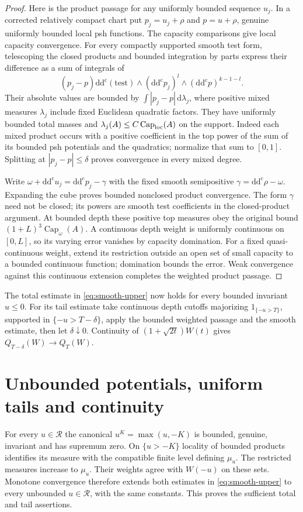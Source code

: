 \documentclass[11pt]{article}
\theoremstyle{remark}
\newcommand{\ddc}{\mathrm{d}\mathrm{d}^{\mathrm c}}
\begin{document}
\begin{proof}
Here is the product passage for any uniformly bounded sequence $u_j$.
In a corrected relatively compact chart put $p_j=u_j+\rho$ and
$p=u+\rho$, genuine uniformly bounded local psh functions. The capacity
comparisons give local capacity convergence. For every compactly supported
smooth test form, telescoping the closed products and bounded integration
by parts express their difference as a sum of integrals of
\[
 (p_j-p)\ddc(\text{test})\wedge
          (\ddc p_j)^l\wedge(\ddc p)^{k-1-l}.
\]
Their absolute values are bounded by $\int|p_j-p|\,\mathrm d\lambda_j$,
where positive mixed measures $\lambda_j$ include fixed Euclidean
quadratic factors. They have uniformly bounded total masses and
$\lambda_j(A)\leq C\operatorname{Cap}_{\rm loc}(A)$ on the support.
Indeed each mixed product occurs with a positive coefficient in the
top power of the sum of its bounded psh potentials and the quadratics;
normalize that sum to $[0,1]$. Splitting at $|p_j-p|\leq\delta$ proves
convergence in every mixed degree.

Write $\omega+\ddc u_j=\ddc p_j-\gamma$ with the fixed smooth
semipositive $\gamma=\ddc\rho-\omega$. Expanding the cube proves
bounded nonclosed product convergence. The form $\gamma$ need not be
closed; its powers are smooth test coefficients in the closed-product
argument. At bounded depth these positive top measures obey the original
bound $(1+L)^3\operatorname{Cap}_\omega(A)$.
A continuous depth weight is uniformly continuous on $[0,L]$, so its
varying error vanishes by capacity domination. For a fixed
quasi-continuous weight, extend its restriction outside an open set of
small capacity to a bounded continuous function; domination bounds the
error. Weak convergence against this continuous extension completes the
weighted product passage.
\end{proof}

The total estimate in \eqref{eq:smooth-upper} now holds for every bounded
invariant $u\leq0$. For its tail estimate take continuous depth cutoffs
majorizing $1_{\{-u>T\}}$, supported in $\{-u>T-\delta\}$, apply the
bounded weighted passage and the smooth estimate, then let
$\delta\downarrow0$. Continuity of $(1+\sqrt{2t})W(t)$ gives
$Q_{T-\delta}(W)\to Q_T(W)$.

\section{Unbounded potentials, uniform tails and continuity}
For every $u\in\mathcal R$ the canonical $u^K=\max(u,-K)$ is bounded,
genuine, invariant and has supremum zero. On $\{u>-K\}$ locality of
bounded products identifies its measure with the compatible finite
level defining $\mu_u$. The restricted measures increase to $\mu_u$.
Their weights agree with $W(-u)$ on these sets. Monotone convergence
therefore extends both estimates in \eqref{eq:smooth-upper} to every
unbounded $u\in\mathcal R$, with the same constants. This proves the
sufficient total and tail assertions.
\end{document}
